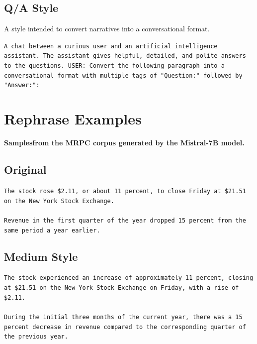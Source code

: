 \subsection*{Q/A Style}
A style intended to convert narratives into a conversational format.
\begin{tcolorbox}[colback=gray!20, colframe=gray!75, rounded corners, sharp corners=northeast, sharp corners=southwest]
\texttt{A chat between a curious user and an artificial intelligence assistant. The assistant gives helpful, detailed, and polite answers to the questions. USER: Convert the following paragraph into a conversational format with multiple tags of "Question:" followed by "Answer:":}
\end{tcolorbox}

\clearpage

\section{Rephrase Examples}
\textbf{Samplesfrom the MRPC corpus generated by the Mistral-7B model.}

\subsection*{Original}
\begin{tcolorbox}[colback=gray!20, colframe=gray!75, rounded corners, sharp corners=northeast, sharp corners=southwest]
\texttt{The stock rose \$2.11, or about 11 percent, to close Friday at \$21.51 on the New York Stock Exchange.\\\\
    Revenue in the first quarter of the year dropped 15 percent from the same period a year earlier.}
\end{tcolorbox}

\subsection*{Medium Style}
\begin{tcolorbox}[colback=gray!20, colframe=gray!75, rounded corners, sharp corners=northeast, sharp corners=southwest]
\texttt{The stock experienced an increase of approximately 11 percent, closing at \$21.51 on the New York Stock Exchange on Friday, with a rise of \$2.11.\\\\
During the initial three months of the current year, there was a 15 percent decrease in revenue compared to the corresponding quarter of the previous year.}
\end{tcolorbox}

